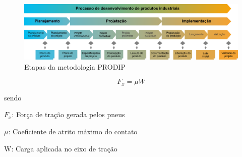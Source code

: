 
\begin{figure}[htb]
	\caption{\label{fig:Fig_401}Etapas da metodologia PRODIP}
	\begin{center}
		\includegraphics[width=\textwidth]{images/img401.png}
	\end{center}
\end{figure}




\begin{equation}\label{eq:Eq_301}
F_{x} = \mu W
\end{equation}

sendo

$F_{x}$: Força de tração gerada pelos pneus

$\mu$: Coeficiente de atrito máximo do contato

W: Carga aplicada no eixo de tração






